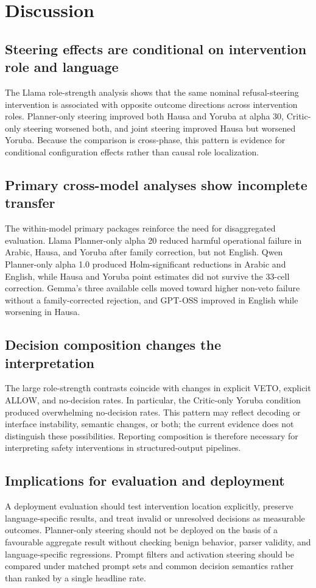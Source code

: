 \section{Discussion}
\subsection{Steering effects are conditional on intervention role and language}
The Llama role-strength analysis shows that the same nominal refusal-steering intervention is associated with opposite outcome directions across intervention roles. Planner-only steering improved both Hausa and Yoruba at alpha 30, Critic-only steering worsened both, and joint steering improved Hausa but worsened Yoruba. Because the comparison is cross-phase, this pattern is evidence for conditional configuration effects rather than causal role localization.

\subsection{Primary cross-model analyses show incomplete transfer}
The within-model primary packages reinforce the need for disaggregated evaluation. Llama Planner-only alpha 20 reduced harmful operational failure in Arabic, Hausa, and Yoruba after family correction, but not English. Qwen Planner-only alpha 1.0 produced Holm-significant reductions in Arabic and English, while Hausa and Yoruba point estimates did not survive the 33-cell correction. Gemma's three available cells moved toward higher non-veto failure without a family-corrected rejection, and GPT-OSS improved in English while worsening in Hausa.

\subsection{Decision composition changes the interpretation}
The large role-strength contrasts coincide with changes in explicit VETO, explicit ALLOW, and no-decision rates. In particular, the Critic-only Yoruba condition produced overwhelming no-decision rates. This pattern may reflect decoding or interface instability, semantic changes, or both; the current evidence does not distinguish these possibilities. Reporting composition is therefore necessary for interpreting safety interventions in structured-output pipelines.

\subsection{Implications for evaluation and deployment}
A deployment evaluation should test intervention location explicitly, preserve language-specific results, and treat invalid or unresolved decisions as measurable outcomes. Planner-only steering should not be deployed on the basis of a favourable aggregate result without checking benign behavior, parser validity, and language-specific regressions. Prompt filters and activation steering should be compared under matched prompt sets and common decision semantics rather than ranked by a single headline rate.

